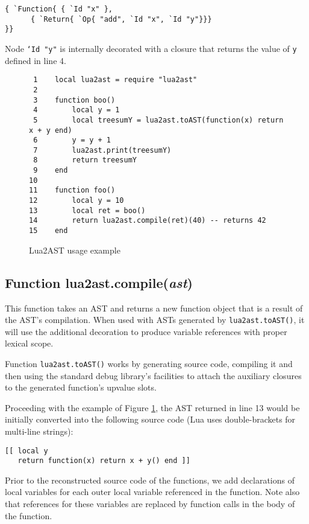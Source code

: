 \documentclass[english]{llncs}
\begin{document}
\begin{verbatim}
{ `Function{ { `Id "x" },
      { `Return{ `Op{ "add", `Id "x", `Id "y"}}}
}}
\end{verbatim}

Node \texttt{`Id "y"} is internally decorated with a closure that returns the value of \texttt{y} defined in line 4.

\begin{figure}[t]
\begin{verbatim}
 1    local lua2ast = require "lua2ast"
 2    
 3    function boo()
 4        local y = 1
 5        local treesumY = lua2ast.toAST(function(x) return x + y end)
 6        y = y + 1
 7        lua2ast.print(treesumY)
 8        return treesumY
 9    end
10    
11    function foo()	
12        local y = 10
13        local ret = boo()
14        return lua2ast.compile(ret)(40) -- returns 42
15    end
\end{verbatim}
\protect\caption{\label{fig:Lua2ASTExample}Lua2AST usage example}
\end{figure}

\subsection{Function lua2ast.compile(\emph{ast})}

This function takes an AST and returns a new function object that is a result of the AST's compilation.
When used with ASTs generated by \texttt{lua2ast.toAST()}, it will use the additional
decoration to produce variable references with proper lexical scope.

Function \texttt{lua2ast.toAST()} works by generating source code,
compiling it and then using the standard debug library's
facilities to attach the auxiliary closures to the generated function's
upvalue slots.

Proceeding with the example of Figure \ref{fig:Lua2ASTExample}, 
the AST returned in line 13 would be initially converted into the
following source code (Lua uses double-brackets for multi-line strings):

\begin{verbatim}
[[ local y
   return function(x) return x + y() end ]]
\end{verbatim}

Prior to the reconstructed source code of the functions,
we add declarations of local variables for each outer local variable
referenced in the function. Note also that references for these
variables are replaced by function calls in the body of the function.
\end{document}
